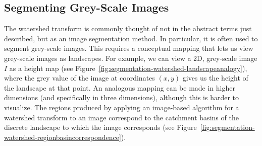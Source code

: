 \subsection{Segmenting Grey-Scale Images}
\label{subsec:segmentation-watershed-greyscale}

The watershed transform is commonly thought of not in the abstract terms just described, but as an image segmentation method. In particular, it is often used to segment grey-scale images. This requires a conceptual mapping that lets us view grey-scale images as landscapes. For example, we can view a 2D, grey-scale image $I$ as a height map (see Figure~\ref{fig:segmentation-watershed-landscapeanalogy}), where the grey value of the image at coordinates $(x,y)$ gives us the height of the landscape at that point. An analogous mapping can be made in higher dimensions (and specifically in three dimensions), although this is harder to visualize. The regions produced by applying an image-based algorithm for a watershed transform to an image correspond to the catchment basins of the discrete landscape to which the image corresponds (see Figure~\ref{fig:segmentation-watershed-regionbasincorrespondence}).


